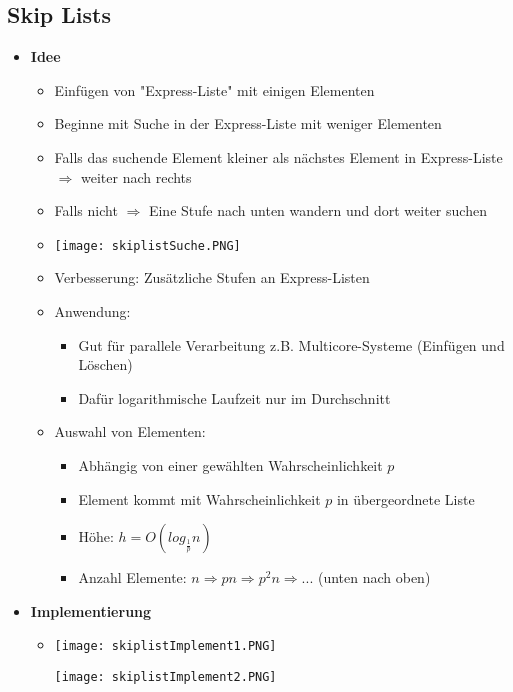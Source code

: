 \subsection{Skip Lists}
    \begin{itemize}
        \item \textbf{Idee}
            \begin{itemize}
                \item Einfügen von \string"Express-Liste\string" mit einigen Elementen
                \item Beginne mit Suche in der Express-Liste mit weniger Elementen
                \item Falls das suchende Element kleiner als nächstes Element in Express-Liste $\Rightarrow$ weiter nach rechts
                \item Falls nicht $\Rightarrow$ Eine Stufe nach unten wandern und dort weiter suchen
                \item[] \texttt{[image: skiplistSuche.PNG]}
                \item Verbesserung: Zusätzliche Stufen an Express-Listen 
                \item Anwendung: 
                \begin{itemize}
                    \item Gut für parallele Verarbeitung z.B. Multicore-Systeme (Einfügen und Löschen)
                    \item Dafür logarithmische Laufzeit nur im Durchschnitt
                \end{itemize}
                \item Auswahl von Elementen:
                    \begin{itemize}
                        \item Abhängig von einer gewählten Wahrscheinlichkeit $p$ 
                        \item Element kommt mit Wahrscheinlichkeit $p$ in übergeordnete Liste
                        \item Höhe: $h = O(log_{\frac{1}{p}}n)$
                        \item Anzahl Elemente: $n \Rightarrow pn \Rightarrow p^2n \Rightarrow ...$ (unten nach oben)
                    \end{itemize}
            \end{itemize}

        \item \textbf{Implementierung}
            \begin{itemize}
                \item[]
                    \begin{minipage}{0.5\textwidth}
                        \texttt{[image: skiplistImplement1.PNG]}
                    \end{minipage}
                    \begin{minipage}{0.4\textwidth}
                        \texttt{[image: skiplistImplement2.PNG]}
                    \end{minipage}
            \end{itemize}


\end{itemize}
